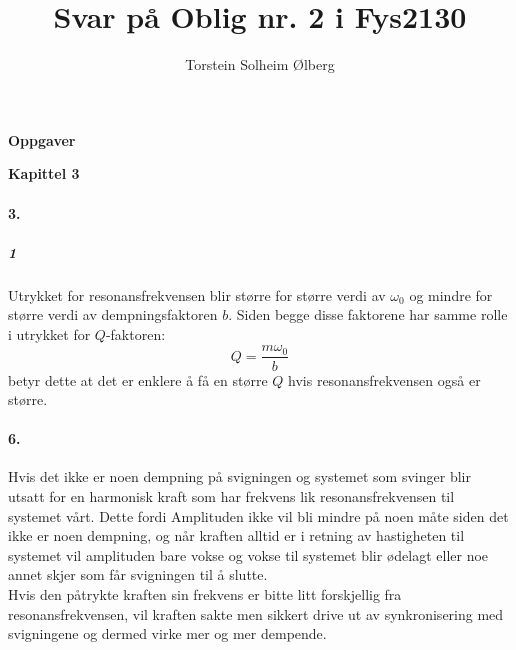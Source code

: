 \documentclass[11pt, A4paper,norsk]{article}
\author{Torstein Solheim Ølberg}
\title{Svar på Oblig nr. 2 i Fys2130}
\begin{document}
\maketitle
	\begin{center}
\Large \textbf{Oppgaver}
	\end{center}








	\begin{flushleft}
\textbf{Kapittel 3}
	\end{flushleft}
		\paragraph{3.}
			\subparagraph{1}
			\begin{flushleft}
Utrykket for resonansfrekvensen blir større for større verdi av $\omega_0$ og mindre for større verdi av dempningsfaktoren $b$. Siden begge disse faktorene har samme rolle i utrykket for $Q$-faktoren: $$Q = \frac{m \omega_0}{b}$$ betyr dette at det er enklere å få en større $Q$ hvis resonansfrekvensen også er større.
			\end{flushleft}









		\paragraph{6.}
			\begin{flushleft}
Hvis det ikke er noen dempning på svigningen og systemet som svinger blir utsatt for en harmonisk kraft som har frekvens lik resonansfrekvensen til systemet vårt. Dette fordi Amplituden ikke vil bli mindre på noen måte siden det ikke er noen dempning, og når kraften alltid er i retning av hastigheten til systemet vil amplituden bare vokse og vokse til systemet blir ødelagt eller noe annet skjer som får svigningen til å slutte. \\
Hvis den påtrykte kraften sin frekvens er bitte litt forskjellig fra resonansfrekvensen, vil kraften sakte men sikkert drive ut av synkronisering med svigningene og dermed virke mer og mer dempende.
			\end{flushleft}
\clearpage
\end{document}
